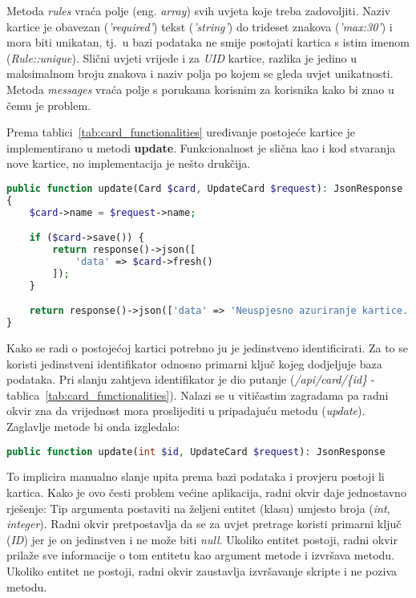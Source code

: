 Metoda \textit{rules} vraća polje (eng. \textit{array}) svih uvjeta koje treba zadovoljiti.
Naziv kartice je obavezan (\textit{'required'}) tekst (\textit{'string'}) do trideset znakova (\textit{'max:30'}) i mora biti
unikatan, tj.\ u bazi podataka ne smije postojati kartica s istim imenom (\textit{Rule::unique}).
Slični uvjeti vrijede i za \textit{UID} kartice, razlika je jedino u maksimalnom broju znakova i naziv polja po kojem se
gleda uvjet unikatnosti.
Metoda \textit{messages} vraća polje s porukama korisnim za korisnika kako bi znao u čemu je problem.

\pagebreak

Prema tablici~\ref{tab:card_functionalities} uređivanje postojeće kartice je implementirano u metodi \textbf{update}.
Funkcionalnost je slična kao i kod stvaranja nove kartice, no implementacija je nešto drukčija.

\begin{lstlisting}[language=PHP]
public function update(Card $card, UpdateCard $request): JsonResponse
{
    $card->name = $request->name;

    if ($card->save()) {
        return response()->json([
            'data' => $card->fresh()
        ]);
    }

    return response()->json(['data' => 'Neuspjesno azuriranje kartice. Pokusajte ponovo!']);
}
\end{lstlisting}

Kako se radi o postojećoj kartici potrebno ju je jedinstveno identificirati.
Za to se koristi jedinstveni identifikator odnosno primarni ključ kojeg dodjeljuje baza podataka.
Pri slanju zahtjeva identifikator je dio putanje (\textit{/api/card/\{id\}} - tablica~\ref{tab:card_functionalities}).
Nalazi se u vitičastim zagradama pa radni okvir zna da vrijednost mora proslijediti u pripadajuću metodu (\textit{update}).
Zaglavlje metode bi onda izgledalo:

\begin{lstlisting}[language=PHP]
public function update(int $id, UpdateCard $request): JsonResponse
\end{lstlisting}

To implicira manualno slanje upita prema bazi podataka i provjeru postoji li kartica.
Kako je ovo česti problem većine aplikacija, radni okvir daje jednostavno rješenje: Tip argumenta postaviti na željeni
entitet (klasu) umjesto broja (\textit{int}, \textit{integer}).
Radni okvir pretpostavlja da se za uvjet pretrage koristi primarni ključ (\textit{ID}) jer je on jedinstven i ne može
biti \textit{null}.
Ukoliko entitet postoji, radni okvir prilaže sve informacije o tom entitetu kao argument metode i izvršava metodu.
Ukoliko entitet ne postoji, radni okvir zaustavlja izvršavanje skripte i ne poziva metodu.

